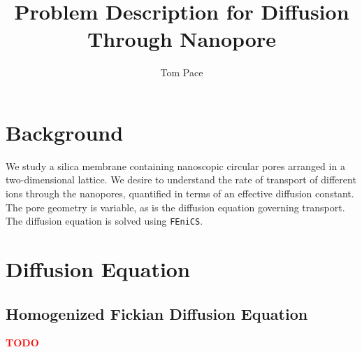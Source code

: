 \documentclass{article}
\begin{document}
\title{Problem Description for Diffusion Through Nanopore}
\author{Tom Pace}
\maketitle

\tableofcontents

\section{Background}\label{sec:background}

We study a silica membrane containing nanoscopic circular pores arranged in a two-dimensional lattice.
We desire to understand the rate of transport of different ions through the nanopores,
quantified in terms of an effective diffusion constant.
The pore geometry is variable, as is the diffusion equation governing transport.
The diffusion equation is solved using \texttt{FEniCS}.





\section{Diffusion Equation}\label{sec:equation}





\subsection{Homogenized Fickian Diffusion Equation}\label{subsec:hom_fick}

\textcolor{red}{\textbf{TODO}}
\end{document}
